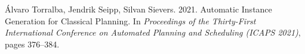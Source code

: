 \documentclass{article}
\begin{document}
                

        \newpage
            \begin{thebibliography}{1}
                 {\'{A}}lvaro Torralba, Jendrik Seipp, Silvan Sievers. 2021. Automatic Instance Generation for Classical Planning. In \emph{Proceedings of the Thirty-First International Conference on Automated
               Planning and Scheduling (ICAPS 2021)}, pages 376--384.
            \end{thebibliography}
        
\end{document}
